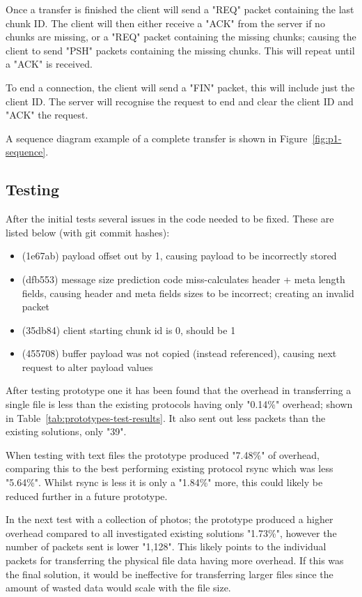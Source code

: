 Once a transfer is finished the client will send a "REQ" packet containing the last chunk ID. The client will then either receive a "ACK" from the server if no chunks are missing, or a "REQ" packet containing the missing chunks; causing the client to send "PSH" packets containing the missing chunks. This will repeat until a "ACK" is received.

To end a connection, the client will send a "FIN" packet, this will include just the client ID. The server will recognise the request to end and clear the client ID and "ACK" the request.

A sequence diagram example of a complete transfer is shown in Figure~\ref{fig:p1-sequence}.


\subsection*{Testing}
After the initial tests several issues in the code needed to be fixed. These are listed below (with git commit hashes):

\begin{itemize}
    \item (1e67ab) payload offset out by 1, causing payload to be incorrectly stored
    \item (dfb553) message size prediction code miss-calculates header + meta length fields, causing header and meta fields sizes to be incorrect; creating an invalid packet
    \item (35db84) client starting chunk id is 0, should be 1
    \item (455708) buffer payload was not copied (instead referenced), causing next request to alter payload values
\end{itemize}

After testing prototype one it has been found that the overhead in transferring a single file is less than the existing protocols having only "0.14\%" overhead; shown in Table~\ref{tab:prototypes-test-results}. It also sent out less packets than the existing solutions, only "39".

When testing with text files the prototype produced "7.48\%" of overhead, comparing this to the best performing existing protocol rsync which was less "5.64\%". Whilst rsync is less it is only a
"1.84\%" more, this could likely be reduced further in a future prototype.

In the next test with a collection of photos; the prototype produced a higher overhead compared to all investigated existing solutions "1.73\%", however the number of packets sent is lower "1,128". This likely points to the individual packets for transferring the physical file data having more overhead. If this was the final solution, it would be ineffective for transferring larger files since the amount of wasted data would scale with the file size.

